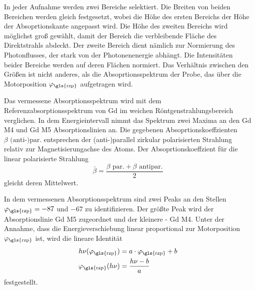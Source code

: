 \noindent
In jeder Aufnahme werden zwei Bereiche selektiert. Die Breiten von beiden Bereichen werden gleich festgesetzt, wobei die Höhe des ersten Bereichs der Höhe der Absoprtionskante angepasst wird. Die Höhe des zweiten Bereichs wird möglichst groß gewählt, damit der Bereich die verbleibende Fläche des Direktstrahls abdeckt. Der zweite Bereich dient nämlich zur Normierung des Photonflusses, der stark von der Photonenenergie abhängt. Die Intensitäten beider Bereiche werden auf deren Flächen normiert. Das Verhältnis zwischen den Größen ist nicht anderes, als die Absoprtionsspektrum der Probe, das über die Motorposition $\varphi_\text{\gls{rzp}}$ aufgetragen wird.

\noindent
Das vermessene Absorptionsspektrum wird mit dem Referenzabsorptionsspektrum von Gd im weichen Röntgenstrahlungsbereich verglichen. In dem Energieintervall nimmt das Spektrum zwei Maxima an den Gd M4 und Gd M5 Absorptionslinien an. Die gegebenen \cite[Abb. 2]{prieto-x-ray-2005} Absoprtionskoeffzienten $\beta \text{ (anti-)par.}$ entsprechen der (anti-)parallel zirkular polarisierten Strahlung relativ zur Magnetisierungachse des Atoms. Der Absoprtionskoeffzient für die linear polarisierte Strahlung 
\begin{equation}
    \bar{\beta} = \frac{\beta \text{ par.} + \beta \text{ antipar.}}{2}
\end{equation}
gleicht deren Mittelwert.

\noindent
In dem vermessenen Absorptionsspektrum sind zwei Peaks an den Stellen $\varphi_\text{\gls{rzp}} = \num{-87}$ und \num{-67} zu identifizieren. Der größte Peak wird der Absorptionslinie Gd M5 zugeordnet und der kleinere - Gd M4. Unter der Annahme, dass die Energieverschiebung linear proportional zur Motorposition $\varphi_\text{\gls{rzp}}$ ist, wird die lineare Identität
\begin{equation}
    \begin{split}
        h\nu(\varphi_\text{\gls{rzp}}) &= a\cdot \varphi_\text{\gls{rzp}} + b\\
        \varphi_\text{\gls{rzp}}(h\nu) &= \frac{h\nu - b}{a}
    \end{split}
\end{equation}
festgestellt.

